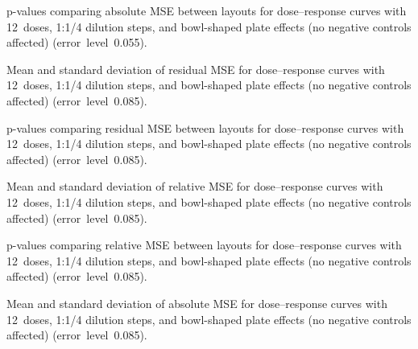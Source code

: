 \begin{table}[p]
    \centering
    \small
    
    \caption{p-values comparing absolute \ECIC{} MSE between layouts for dose--response curves with 12~doses, 1:1/4 dilution steps, and bowl-shaped plate effects (no negative controls affected) (error~level~0.055).}
    \label{tab:dr-absic50-pvalues-12doses-dil4-bowl-0.055}
\end{table}

\begin{table}[p]
    \centering
    \small
    
    \caption{Mean and standard deviation of residual MSE for dose--response curves with 12~doses, 1:1/4 dilution steps, and bowl-shaped plate effects (no negative controls affected) (error~level~0.085).}
    \label{tab:dr-residuals-mean-std-12doses-dil4-bowl-0.085}
\end{table}

\begin{table}[p]
    \centering
    \small
    
    \caption{p-values comparing residual MSE between layouts for dose--response curves with 12~doses, 1:1/4 dilution steps, and bowl-shaped plate effects (no negative controls affected) (error~level~0.085).}
    \label{tab:dr-residuals-pvalues-12doses-dil4-bowl-0.085}
\end{table}

\clearpage
\begin{table}[p]
    \centering
    \small
    
    \caption{Mean and standard deviation of relative \ECIC{} MSE for dose--response curves with 12~doses, 1:1/4 dilution steps, and bowl-shaped plate effects (no negative controls affected) (error~level~0.085).}
    \label{tab:dr-relic50-mean-std-12doses-dil4-bowl-0.085}
\end{table}

\begin{table}[p]
    \centering
    \small
    
    \caption{p-values comparing relative \ECIC{} MSE between layouts for dose--response curves with 12~doses, 1:1/4 dilution steps, and bowl-shaped plate effects (no negative controls affected) (error~level~0.085).}
    \label{tab:dr-relic50-pvalues-12doses-dil4-bowl-0.085}
\end{table}

\begin{table}[p]
    \centering
    \small
    
    \caption{Mean and standard deviation of absolute \ECIC{} MSE for dose--response curves with 12~doses, 1:1/4 dilution steps, and bowl-shaped plate effects (no negative controls affected) (error~level~0.085).}
    \label{tab:dr-absic50-mean-std-12doses-dil4-bowl-0.085}
\end{table}

